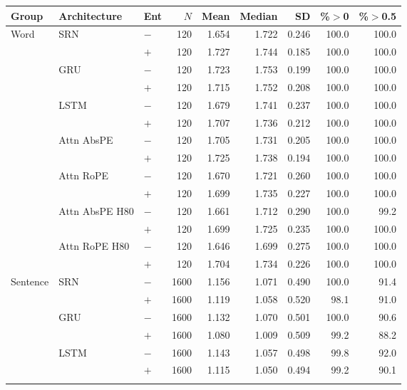\begin{table}[t]
\centering\footnotesize
\begin{tabular}{@{}lllrrrrrr@{}}
\toprule
\textbf{Group} & \textbf{Architecture} & \textbf{Ent} & \textbf{$N$} & \textbf{Mean} & \textbf{Median} & \textbf{SD} & \textbf{\%${>}$0} & \textbf{\%${>}$0.5} \\
\midrule
Word & SRN & $-$ & 120 & 1.654 & 1.722 & 0.246 & 100.0 & 100.0 \\
 &  & $+$ & 120 & 1.727 & 1.744 & 0.185 & 100.0 & 100.0 \\
\addlinespace[1pt]
 & GRU & $-$ & 120 & 1.723 & 1.753 & 0.199 & 100.0 & 100.0 \\
 &  & $+$ & 120 & 1.715 & 1.752 & 0.208 & 100.0 & 100.0 \\
\addlinespace[1pt]
 & LSTM & $-$ & 120 & 1.679 & 1.741 & 0.237 & 100.0 & 100.0 \\
 &  & $+$ & 120 & 1.707 & 1.736 & 0.212 & 100.0 & 100.0 \\
\addlinespace[1pt]
 & Attn AbsPE & $-$ & 120 & 1.705 & 1.731 & 0.205 & 100.0 & 100.0 \\
 &  & $+$ & 120 & 1.725 & 1.738 & 0.194 & 100.0 & 100.0 \\
\addlinespace[1pt]
 & Attn RoPE & $-$ & 120 & 1.670 & 1.721 & 0.260 & 100.0 & 100.0 \\
 &  & $+$ & 120 & 1.699 & 1.735 & 0.227 & 100.0 & 100.0 \\
\addlinespace[1pt]
 & Attn AbsPE H80 & $-$ & 120 & 1.661 & 1.712 & 0.290 & 100.0 & 99.2 \\
 &  & $+$ & 120 & 1.699 & 1.725 & 0.235 & 100.0 & 100.0 \\
\addlinespace[1pt]
 & Attn RoPE H80 & $-$ & 120 & 1.646 & 1.699 & 0.275 & 100.0 & 100.0 \\
 &  & $+$ & 120 & 1.704 & 1.734 & 0.226 & 100.0 & 100.0 \\
\addlinespace
Sentence & SRN & $-$ & 1600 & 1.156 & 1.071 & 0.490 & 100.0 & 91.4 \\
 &  & $+$ & 1600 & 1.119 & 1.058 & 0.520 & 98.1 & 91.0 \\
\addlinespace[1pt]
 & GRU & $-$ & 1600 & 1.132 & 1.070 & 0.501 & 100.0 & 90.6 \\
 &  & $+$ & 1600 & 1.080 & 1.009 & 0.509 & 99.2 & 88.2 \\
\addlinespace[1pt]
 & LSTM & $-$ & 1600 & 1.143 & 1.057 & 0.498 & 99.8 & 92.0 \\
 &  & $+$ & 1600 & 1.115 & 1.050 & 0.494 & 99.2 & 90.1 \\
\addlinespace[1pt]

\end{tabular}
\end{table}

